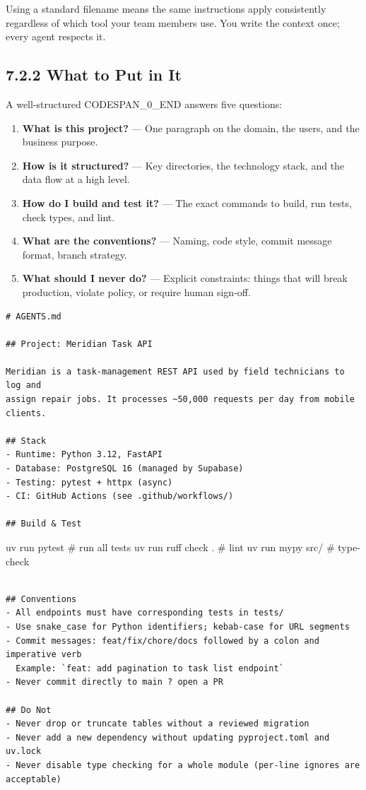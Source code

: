 \documentclass[11pt,a4paper]{book}
\begin{document}
Using a standard filename means the same instructions apply consistently regardless of which tool your team members use. You write the context once; every agent respects it.

\subsection{7.2.2 What to Put in It}

A well-structured CODESPAN\_0\_END answers five questions:

\begin{enumerate}
  \item \textbf{What is this project?} --- One paragraph on the domain, the users, and the business purpose.
  \item \textbf{How is it structured?} --- Key directories, the technology stack, and the data flow at a high level.
  \item \textbf{How do I build and test it?} --- The exact commands to build, run tests, check types, and lint.
  \item \textbf{What are the conventions?} --- Naming, code style, commit message format, branch strategy.
  \item \textbf{What should I never do?} --- Explicit constraints: things that will break production, violate policy, or require human sign-off.
\end{enumerate}

\begin{lstlisting}
# AGENTS.md

## Project: Meridian Task API

Meridian is a task-management REST API used by field technicians to log and 
assign repair jobs. It processes ~50,000 requests per day from mobile clients.

## Stack
- Runtime: Python 3.12, FastAPI
- Database: PostgreSQL 16 (managed by Supabase)
- Testing: pytest + httpx (async)
- CI: GitHub Actions (see .github/workflows/)

## Build & Test
\end{lstlisting}
uv run pytest                   \# run all tests
uv run ruff check .             \# lint
uv run mypy src/                \# type-check
\begin{lstlisting}

## Conventions
- All endpoints must have corresponding tests in tests/
- Use snake_case for Python identifiers; kebab-case for URL segments
- Commit messages: feat/fix/chore/docs followed by a colon and imperative verb
  Example: `feat: add pagination to task list endpoint`
- Never commit directly to main ? open a PR

## Do Not
- Never drop or truncate tables without a reviewed migration
- Never add a new dependency without updating pyproject.toml and uv.lock
- Never disable type checking for a whole module (per-line ignores are acceptable)
\end{lstlisting}
\end{document}
